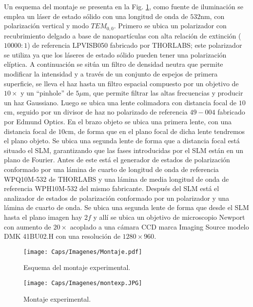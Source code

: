 Un esquema del montaje se presenta en la Fig. \ref{fig:montaje}, como fuente de iluminación se emplea un láser de estado sólido con una longitud de onda de $532$nm, con polarización vertical y modo $TEM_{0,0}$. Primero se ubica un polarizador con recubrimiento delgado a base de nanopartículas con alta relación de extinción ($10000:1$) de referencia LPVISB050 fabricado por THORLABS; este polarizador se utiliza ya que los láseres de estado sólido pueden tener una polarización elíptica. A continuación se sitúa un filtro de densidad neutra que permite modificar la intensidad y a través de un conjunto de espejos de primera superficie, se lleva el haz hasta un filtro espacial compuesto por un objetivo de $10\times$ y un ``pinhole'' de $5\mu $m, que permite filtrar las altas frecuencias y producir un haz Gaussiano. Luego se ubica una lente colimadora con distancia focal de $10$cm, seguido por un divisor de haz no polarizado de referencia $49-004$ fabricado por Edmund Optics. En el brazo objeto se ubica una primera lente, con una distancia focal de $10$cm, de forma que en el plano focal de dicha lente tendremos el plano objeto. Se ubica una segunda lente de forma que a distancia focal está situado el SLM, garantizando que las fases introducidas por el SLM están en un plano de Fourier. Antes de este está el generador de estados de polarización conformado por una lámina de cuarto de longitud de onda de referencia WPQ10M-532 de THORLABS y una lámina de media longitud de onda de referencia WPH10M-532 del mismo fabricante. Después del SLM está el analizador de estados de polarización conformado por un polarizador y una lámina de cuarto de onda. Se ubica una segunda lente de forma que desde el SLM hasta el plano imagen hay $2f$ y allí se ubica un objetivo de microscopio Newport con aumento de $20\times$ acoplado a una cámara CCD marca Imaging Source modelo DMK 41BU02.H con una resolución de $1280 \times 960$. 


\begin{figure}[!ht]
  \centering
    \texttt{[image: Caps/Imagenes/Montaje.pdf]}
  \caption{Esquema del montaje experimental.}
  \label{fig:montaje}
\end{figure}



\begin{figure}[!ht]
  \centering
    \texttt{[image: Caps/Imagenes/montexp.JPG]}
  \caption{Montaje experimental.}
  \label{fig:montexp}
\end{figure}

